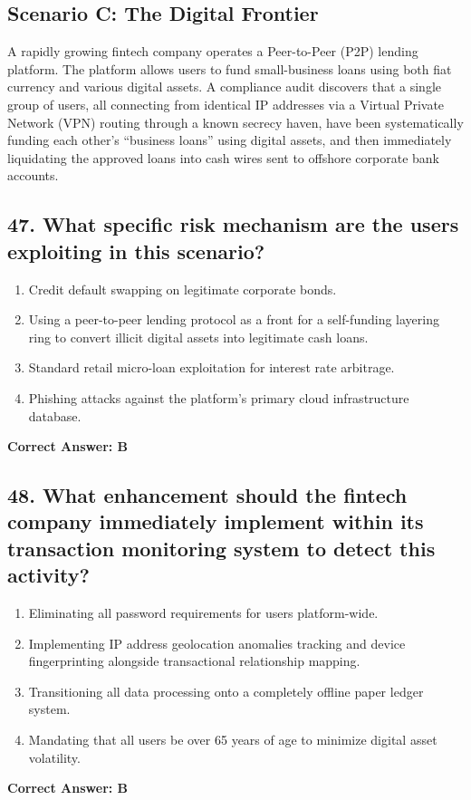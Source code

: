 \documentclass[11pt,a4paper]{article}
\begin{document}
	\subsection*{Scenario C: The Digital Frontier}
	A rapidly growing fintech company operates a Peer-to-Peer (P2P) lending platform. The platform allows users to fund small-business loans using both fiat currency and various digital assets. A compliance audit discovers that a single group of users, all connecting from identical IP addresses via a Virtual Private Network (VPN) routing through a known secrecy haven, have been systematically funding each other’s ``business loans'' using digital assets, and then immediately liquidating the approved loans into cash wires sent to offshore corporate bank accounts.
	
	\subsection{47. What specific risk mechanism are the users exploiting in this scenario?}
	\begin{enumerate}[label=\Alph*.]
		\item Credit default swapping on legitimate corporate bonds.
		\item Using a peer-to-peer lending protocol as a front for a self-funding layering ring to convert illicit digital assets into legitimate cash loans.
		\item Standard retail micro-loan exploitation for interest rate arbitrage.
		\item Phishing attacks against the platform's primary cloud infrastructure database.
	\end{enumerate}
	\textbf{Correct Answer: B}
	
	\subsection{48. What enhancement should the fintech company immediately implement within its transaction monitoring system to detect this activity?}
	\begin{enumerate}[label=\Alph*.]
		\item Eliminating all password requirements for users platform-wide.
		\item Implementing IP address geolocation anomalies tracking and device fingerprinting alongside transactional relationship mapping.
		\item Transitioning all data processing onto a completely offline paper ledger system.
		\item Mandating that all users be over 65 years of age to minimize digital asset volatility.
	\end{enumerate}
	\textbf{Correct Answer: B}
	
\end{document}
